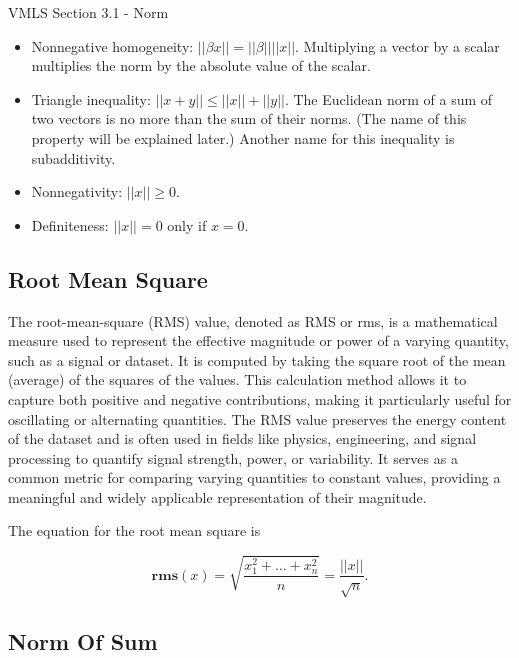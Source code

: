 \begin{notes}{VMLS Section 3.1 - Norm}
    \begin{itemize}
        \item Nonnegative homogeneity: $|| \beta x || = ||\beta|| || x ||$. Multiplying a vector by a scalar multiplies the norm by the absolute value of the scalar.
        \item Triangle inequality: $|| x + y || \leq || x || + || y ||$. The Euclidean norm of a sum of two vectors is no more than the sum of their norms. (The name of this property will be explained later.) 
        Another name for this inequality is subadditivity.
        \item Nonnegativity: $|| x || \geq 0$.
        \item Definiteness: $|| x || = 0$ only if $x = 0$.
    \end{itemize}

    \subsection*{Root Mean Square}

    The root-mean-square (RMS) value, denoted as RMS or rms, is a mathematical measure used to represent the effective magnitude or power of a varying quantity, such as a signal or dataset. It is computed by 
    taking the square root of the mean (average) of the squares of the values. This calculation method allows it to capture both positive and negative contributions, making it particularly useful for oscillating 
    or alternating quantities. The RMS value preserves the energy content of the dataset and is often used in fields like physics, engineering, and signal processing to quantify signal strength, power, or 
    variability. It serves as a common metric for comparing varying quantities to constant values, providing a meaningful and widely applicable representation of their magnitude.

    \begin{highlight}
        The equation for the root mean square is

        \begin{equation*}
            \mathbf{rms}(x) = \sqrt{\frac{x^{2}_{1} + \dots + x^{2}_{n}}{n}} = \frac{||x||}{\sqrt{n}}.
        \end{equation*}
    \end{highlight}

    \subsection*{Norm Of Sum}


\end{notes}
